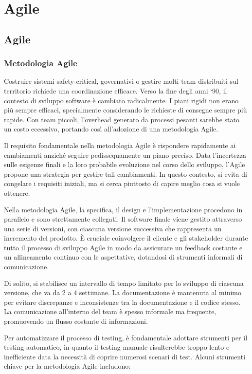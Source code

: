 \chapter{Agile}
\section{Agile}
\subsection{Metodologia Agile}
Costruire sistemi safety-critical, governativi o gestire molti team distribuiti sul territorio richiede una
coordinazione efficace. Verso la fine degli anni `90, il contesto di sviluppo software è cambiato radicalmente.
I piani rigidi non erano più sempre efficaci, specialmente considerando le richieste di consegne sempre più rapide.
Con team piccoli, l'overhead generato da processi pesanti sarebbe stato un costo eccessivo, portando così all'adozione
di una metodologia Agile.

Il requisito fondamentale nella metodologia Agile è rispondere rapidamente ai cambiamenti anziché seguire pedissequamente
un piano preciso. Data l'incertezza sulle esigenze finali e la loro probabile evoluzione nel corso dello sviluppo,
l'Agile propone una strategia per gestire tali cambiamenti. In questo contesto, si evita di congelare i requisiti
iniziali, ma si cerca piuttosto di capire meglio cosa si vuole ottenere.

Nella metodologia Agile, la specifica, il design e l'implementazione procedono in parallelo e sono strettamente collegati.
Il software finale viene gestito attraverso una serie di versioni, con ciascuna versione successiva che rappresenta un
incremento del prodotto. È cruciale coinvolgere il cliente e gli stakeholder durante tutto il processo di sviluppo Agile
in modo da assicurare un feedback costante e un allineamento continuo con le aspettative,
dotandosi di strumenti informali di comunicazione.

Di solito, si stabilisce un intervallo di tempo limitato per lo sviluppo di ciascuna versione, che va da 2 a 4 settimane.
La documentazione è mantenuta al minimo per evitare discrepanze e inconsistenze tra la documentazione e il codice stesso.
La comunicazione all'interno del team è spesso informale ma frequente, promuovendo un flusso costante di informazioni.

Per automatizzare il processo di testing, è fondamentale adottare strumenti per il testing automatico, in quanto il testing
manuale risulterebbe troppo lento e inefficiente data la necessità di coprire numerosi scenari di test. Alcuni strumenti
chiave per la metodologia Agile includono:

